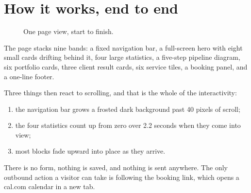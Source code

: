 \documentclass[11pt,a4paper]{article}
\begin{document}
\section{How it works, end to end}

\begin{figure}[H]\centering
{}
\caption{One page view, start to finish.}
\end{figure}

The page stacks nine bands: a fixed navigation bar, a full-screen hero with eight
small cards drifting behind it, four large statistics, a five-step pipeline
diagram, six portfolio cards, three client result cards, six service tiles, a
booking panel, and a one-line footer.

Three things then react to scrolling, and that is the whole of the interactivity:

\begin{enumerate}
\item the navigation bar grows a frosted dark background past 40 pixels of
  scroll;
\item the four statistics count up from zero over 2.2 seconds when they come into
  view;
\item most blocks fade upward into place as they arrive.
\end{enumerate}

There is no form, nothing is saved, and nothing is sent anywhere. The only
outbound action a visitor can take is following the booking link, which opens a
cal.com calendar in a new tab.
\end{document}
